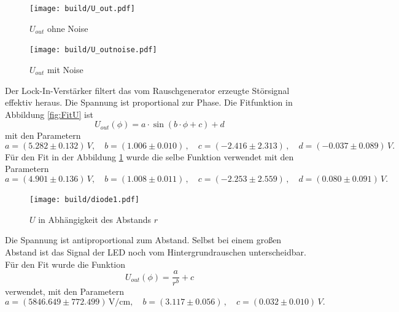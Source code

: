 \begin{figure}[H]
    \begin{minipage}[b]{.49\linewidth} %
       \texttt{[image: build/U\_out.pdf]}
       \caption{$U_{out}$ ohne Noise}
       \label{fig:FitU}
    \end{minipage}
    \hspace{0.02\linewidth}%
    \begin{minipage}[b]{.49\linewidth} %
       \texttt{[image: build/U\_outnoise.pdf]}
       \caption{$U_{out}$ mit Noise}
       \label{fig:FitU_noise}
    \end{minipage}
\end{figure}
Der Lock-In-Verstärker filtert das vom Rauschgenerator erzeugte Störsignal effektiv heraus. Die Spannung ist proportional zur Phase.
Die Fitfunktion in Abbildung \ref{fig:FitU} ist
\begin{equation*}
   U_{out}(\phi) = a \cdot \sin(b\cdot\phi + c) + d
\end{equation*}
mit den Parametern
\begin{equation*}
   a = (5.282 \pm 0.132) \,\unit{V}, \quad b = (1.006 \pm 0.010) \,, \quad c = (-2.416 \pm 2.313) \,, \quad d = (-0.037 \pm 0.089) \,\unit{V}.
\end{equation*}
Für den Fit in der Abbildung \ref{fig:FitU_noise} wurde die selbe Funktion verwendet mit den Parametern
\begin{equation*}
   a = (4.901 \pm 0.136) \,\unit{V}, \quad b = (1.008 \pm 0.011) \,, \quad c = (-2.253 \pm 2.559) \,, \quad d = (0.080 \pm 0.091) \,\unit{V}.
\end{equation*}
\begin{figure}
    \centering
    \texttt{[image: build/diode1.pdf]}
    \caption{$U$ in Abhängigkeit des Abstands $r$}
\end{figure}
Die Spannung ist antiproportional zum Abstand. Selbst bei einem großen Abstand ist das Signal der LED noch vom Hintergrundrauschen unterscheidbar.
Für den Fit wurde die Funktion 
\begin{equation*}
   U_{out}(\phi) = \frac{a}{r^b} + c
\end{equation*}
verwendet, mit den Parametern
\begin{equation*}
   a = (5846.649 \pm 772.499) \,\unit{\V\per\centi\m} , \quad b = (3.117 \pm 0.056) \, , \quad c = (0.032 \pm 0.010) \,\unit{V}.
\end{equation*}

\newpage